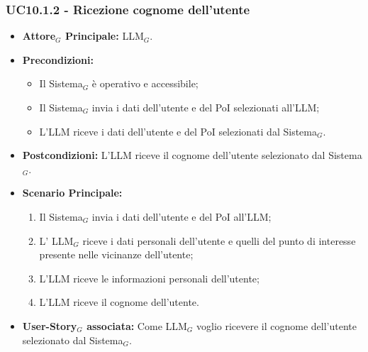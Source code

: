 \documentclass[10pt]{article}
\begin{document}
\begin{justify}
\subsubsection{\textbf{UC10.1.2 - Ricezione cognome dell'utente}}
\begin{itemize}
    \item \textbf{Attore$_G$ Principale:} LLM$_G$.
    \item \textbf{Precondizioni:} 
        \begin{itemize}
          \item Il Sistema$_G$ è operativo e accessibile;
          \item Il Sistema$_G$ invia i dati dell'utente e del PoI selezionati all'LLM;
            \item L'LLM riceve i dati dell'utente e del PoI selezionati dal Sistema$_G$.
        \end{itemize}
      \item \textbf{Postcondizioni:} L'LLM riceve il cognome dell'utente selezionato dal Sistema$_G$.
    \item \textbf{Scenario Principale:} 
        \begin{enumerate}
          \item Il Sistema$_G$ invia i dati dell'utente e del PoI all'LLM;
        \item L' LLM$_G$ riceve i dati personali dell'utente e quelli del punto di interesse presente nelle vicinanze dell'utente;
          \item L'LLM riceve le informazioni personali dell'utente;
          \item L'LLM riceve il cognome dell'utente.
        \end{enumerate}
      \item \textbf{User-Story$_G$ associata:} Come LLM$_G$ voglio ricevere il cognome dell'utente selezionato dal Sistema$_G$.
\end{itemize}

\end{justify}
\end{document}
